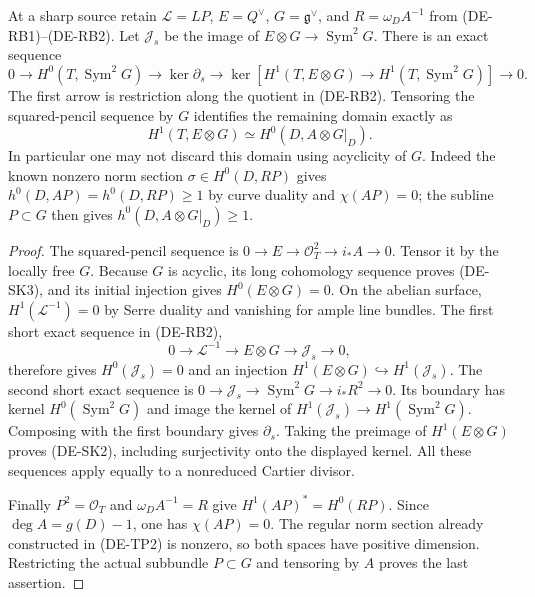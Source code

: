 \begin{lemma}
\label{lem:DE-A3-residual-boundary-kernel-candidate}
At a sharp source retain $\mathcal L=LP$, $E=Q^\vee$, $G=\mathfrak g^\vee$,
and $R=\omega_D A^{-1}$ from (DE-RB1)--(DE-RB2).
Let $\mathcal J_s$ be the image of $E\otimes G\to\operatorname{Sym}^2G$.
There is an exact sequence
\[
 0\longrightarrow H^0(T,\operatorname{Sym}^2G)
 \longrightarrow\ker\partial_s
 \longrightarrow
 \ker\!\left[H^1(T,E\otimes G)
       \longrightarrow H^1(T,\operatorname{Sym}^2G)\right]
 \longrightarrow0.
 \tag{DE-SK2}
\]
The first arrow is restriction along the quotient in (DE-RB2).
Tensoring the squared-pencil sequence by $G$ identifies the remaining
domain exactly as
\[
 H^1(T,E\otimes G)\simeq H^0(D,A\otimes G|_D).
 \tag{DE-SK3}
\]
In particular one may not discard this domain using acyclicity of $G$.
Indeed the known nonzero norm section $\sigma\in H^0(D,RP)$ gives
$h^0(D,AP)=h^0(D,RP)\ge1$ by curve duality and $\chi(AP)=0$;
the subline $P\subset G$ then gives
$h^0(D,A\otimes G|_D)\ge1$.
\end{lemma}
\begin{proof}
The squared-pencil sequence is $0\to E\to\mathcal O_T^2\to i_*A\to0$.
Tensor it by the locally free $G$. Because $G$ is acyclic, its long
cohomology sequence proves (DE-SK3), and its initial injection gives
$H^0(E\otimes G)=0$.
On the abelian surface, $H^1(\mathcal L^{-1})=0$ by Serre duality
and vanishing for ample line bundles. The first short exact sequence
in (DE-RB2),
\[
0\to\mathcal L^{-1}\to E\otimes G\to\mathcal J_s\to0,
\]
therefore gives $H^0(\mathcal J_s)=0$ and an injection
$H^1(E\otimes G)\hookrightarrow H^1(\mathcal J_s)$.
The second short exact sequence is
$0\to\mathcal J_s\to\operatorname{Sym}^2G\to i_*R^2\to0$.
Its boundary has kernel $H^0(\operatorname{Sym}^2G)$ and image the
kernel of $H^1(\mathcal J_s)\to H^1(\operatorname{Sym}^2G)$.
Composing with the first boundary gives $\partial_s$. Taking the
preimage of $H^1(E\otimes G)$ proves (DE-SK2), including surjectivity
onto the displayed kernel. All these sequences apply equally to a
nonreduced Cartier divisor.

Finally $P^2=\mathcal O_T$ and $\omega_D A^{-1}=R$ give
$H^1(AP)^*=H^0(RP)$. Since $\deg A=g(D)-1$, one has $\chi(AP)=0$.
The regular norm section already constructed in (DE-TP2) is nonzero,
so both spaces have positive dimension. Restricting the actual
subbundle $P\subset G$ and tensoring by $A$ proves the last assertion.
\end{proof}

